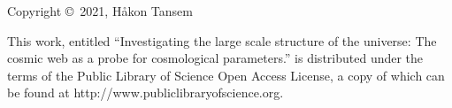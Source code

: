 \documentclass[a4paper,11pt]{book}
\title{\mintittel}
\author{Håkon Tansem}
\date{\today}
\newcommand{\mintittel}{Investigating the large scale structure of the universe: The cosmic web as a probe for cosmological parameters.}
\begin{document}

\vspace*{17cm}
\noindent Copyright \copyright$\,$ 2021, Håkon Tansem
\vspace{4mm}

\noindent This work, entitled ``\mintittel'' is distributed under the
terms of the Public Library of Science Open Access License, a copy of which can be found at
http://www.publiclibraryofscience.org.



\tableofcontents

\listoffigures
\newpage
\thispagestyle{empty}
\mbox{}

\newpage
\pagestyle{fancyplain}











	
%




%
\end{document}
